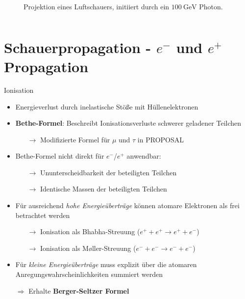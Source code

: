 \documentclass[aspectratio=1610, captions=tableheading, 11pt]{beamer}
\begin{document}
\begin{frame}
\begin{columns}
\begin{figure}
           \captionsetup{format=myformat}
          \caption*{Projektion eines Luftschauers, initiiert durch ein $\SI{100}{\giga\electronvolt}$ Photon\footnotemark.}
      \end{figure}
  \end{columns}
\end{frame}


\section{Schauerpropagation - $e^-$ und $e^+$ Propagation}


\begin{frame}{Ionisation}
	 \begin{itemize}
	 	\setlength\itemsep{0.5em}
	 	\item Energieverlust durch inelastische Stöße mit Hüllenelektronen
	 	\item \textbf{Bethe-Formel}: Beschreibt Ionisationsverluste schwerer geladener Teilchen
	 	\begin{itemize}
          \item[$\rightarrow$] Modifizierte Formel für $\mu$ und $\tau$ in PROPOSAL
	 	\end{itemize}
	 	\vspace{5mm}
	 	\item Bethe-Formel nicht direkt für $e^-$/$e^+$ anwendbar:
	 	\begin{itemize}
          \item[$\rightarrow$] Ununterscheidbarkeit der beteiligten Teilchen
          \item[$\rightarrow$] Identische Massen der beteiligten Teilchen
	 	\end{itemize}
	 \end{itemize}
\end{frame}


\begin{frame}
	 \begin{itemize}
	 	\setlength\itemsep{0.5em}
	 	\item Für ausreichend \emph{hohe Energieüberträge} können atomare Elektronen als frei betrachtet werden
	 	\begin{itemize}
          \item[$\rightarrow$] Ionisation als Bhabha-Streuung ($ e^+ + e^+ \rightarrow e^+ + e^- $)
          \item[$\rightarrow$] Ionisation als Møller-Streuung ($ e^- + e^- \rightarrow e^- + e^- $)
	 	\end{itemize}
        \item Für \emph{kleine Energieüberträge} muss explizit über die atomaren Anregungswahrscheinlichkeiten summiert werden
		\item[$\Rightarrow$]Erhalte \textbf{Berger-Seltzer Formel}
	 \end{itemize}
\end{frame}
\end{document}
